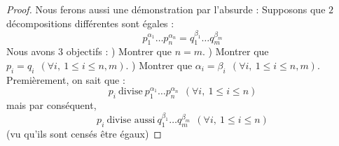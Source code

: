 \begin{proof}
Nous ferons aussi une démonstration par l'absurde : \newline
Supposons que $2$ décompositions différentes sont égales :
\begin{equation*}
    p_1^{\alpha_1} \ldots p_n^{\alpha_n} = q_1^{\beta_1} \ldots q_m^{\beta_m}
\end{equation*}
Nous avons 3 objectifs : ) Montrer que $n=m$. ) Montrer que $p_i=q_i \ \ (\forall i, \ 1 \leq i \leq n,m)$. ) Montrer que $\alpha_i=\beta_i \ \ (\forall i, \ 1 \leq i \leq n,m)$. \newline
\newline
Premièrement, on sait que :
$$p_i \ \text{divise} \ p_1^{\alpha_1} \ldots p_n^{\alpha_n} \ \ (\forall i, \ 1 \leq i \leq n)$$
mais par conséquent,
$$p_i \ \text{divise aussi} \ q_1^{\beta_1} \ldots q_m^{\beta_m} \ \ (\forall i, \ 1 \leq i \leq n)$$ 
(vu qu'ils sont censés être égaux) \newline


\end{proof}
